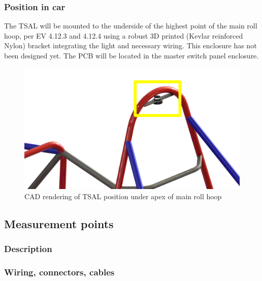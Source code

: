 \documentclass{article}
\begin{document}
\subsubsection{Position in car}
The TSAL will be mounted to the underside of the highest point of the main roll hoop, per EV 4.12.3 and 4.12.4 using a robust 3D printed (Kevlar reinforced Nylon) bracket integrating the light and necessary wiring. This enclosure has not been designed yet. The PCB will be located in the master switch panel enclosure.

\begin{figure}[h]
\centering
\includegraphics[scale=1]{TSAL_mounting.png}
\caption{CAD rendering of TSAL position under apex of main roll hoop}
\end{figure}

\subsection{Measurement points}\label{measurement_points}
\subsubsection{Description}

\subsubsection{Wiring, connectors, cables}
\end{document}
